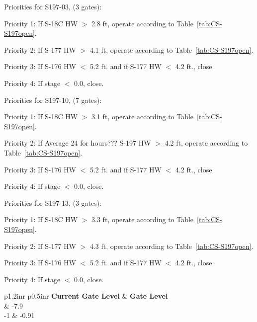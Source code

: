 Priorities for S197-03, (3 gates):
\begin{packed_items}
\item Priority 1: If S-18C HW $>$ 2.8 ft, operate according to Table~\ref{tab:CS-S197open}.
\item Priority 2: If S-177 HW $>$ 4.1 ft, operate according to Table~\ref{tab:CS-S197open}.
\item Priority 3: If S-176 HW $<$ 5.2 ft. and if S-177 HW $<$ 4.2 ft., close.
\item Priority 4: If stage $<$ 0.0, close.
\end{packed_items}


Priorities for S197-10, (7 gates):
\begin{packed_items}
\item Priority 1: If S-18C HW $>$ 3.1 ft, operate according to Table~\ref{tab:CS-S197open}.
\item Priority 2: If \textcolor[rgb]{1.00,0.00,0.00}{Average 24 for hours??? S-197 HW} $>$ 4.2 ft, operate according to Table~\ref{tab:CS-S197open}.
\item Priority 3: If S-176 HW $<$ 5.2 ft. and if S-177 HW $<$ 4.2 ft., close.
\item Priority 4: If stage $<$ 0.0, close.
\end{packed_items}


Priorities for S197-13, (3 gates):
\begin{packed_items}
\item Priority 1: If S-18C HW $>$ 3.3 ft, operate according to Table~\ref{tab:CS-S197open}.
\item Priority 2: If S-177 HW $>$ 4.3 ft, operate according to Table~\ref{tab:CS-S197open}.
\item Priority 3: If S-176 HW $<$ 5.2 ft. and if S-177 HW $<$ 4.2 ft., close.
\item Priority 4: If stage $<$ 0.0, close.
\end{packed_items}


\footnotesize
\begin{table}[!h]
\centering
\caption{Control strategy for S197 open (units are ft. NGVD29)}
\label{tab:CS-S197open}
\begin{tabular}{p{1.2in}{r} p{0.5in}{r}}
\hline
\textbf{Current Gate Level} & \textbf{Gate Level}\\
	& -7.9       \\
-1	& -0.91   \\
\hline
\end{tabular}
\end{table}
\normalsize

